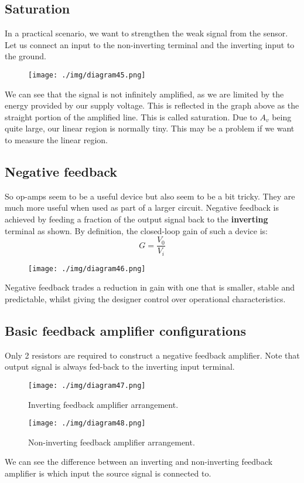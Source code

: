 \subsection{Saturation}
In a practical scenario, we want to strengthen the weak signal from the sensor. Let us connect an input to the non-inverting terminal and the inverting input to the ground.
\begin{figure}[H]
  \centering
  \texttt{[image: ./img/diagram45.png]}
\end{figure}
We can see that the signal is not infinitely amplified, as we are limited by the energy provided by our supply voltage. This is reflected in the graph above as the straight portion of the amplified line. This is called saturation. Due to $A_v$ being quite large, our linear region is normally tiny. This may be a problem if we want to measure the linear region.
\subsection{Negative feedback}
So op-amps seem to be a useful device but also seem to be a bit tricky. They are much more useful when used as part of a larger circuit. Negative feedback is achieved by feeding a fraction of the output signal back to the \textbf{inverting} terminal as shown. By definition, the closed-loop gain of such a device is:
\begin{equation}
  G = \frac{V_0}{V_i}
\end{equation}
\begin{figure}[H]
  \centering
  \texttt{[image: ./img/diagram46.png]}
\end{figure}
Negative feedback trades a reduction in gain with one that is smaller, stable and predictable, whilst giving the designer control over operational characteristics.
\subsection{Basic feedback amplifier configurations}
Only 2 resistors are required to construct a negative feedback amplifier. Note that output signal is always fed-back to the inverting input terminal.
\begin{figure}[H]
  \centering
  \texttt{[image: ./img/diagram47.png]}
  \caption{Inverting feedback amplifier arrangement.}
\end{figure}
\begin{figure}[H]
  \centering
  \texttt{[image: ./img/diagram48.png]}
  \caption{Non-inverting feedback amplifier arrangement.}
\end{figure}
We can see the difference between an inverting and non-inverting feedback amplifier is which input the source signal is connected to.
